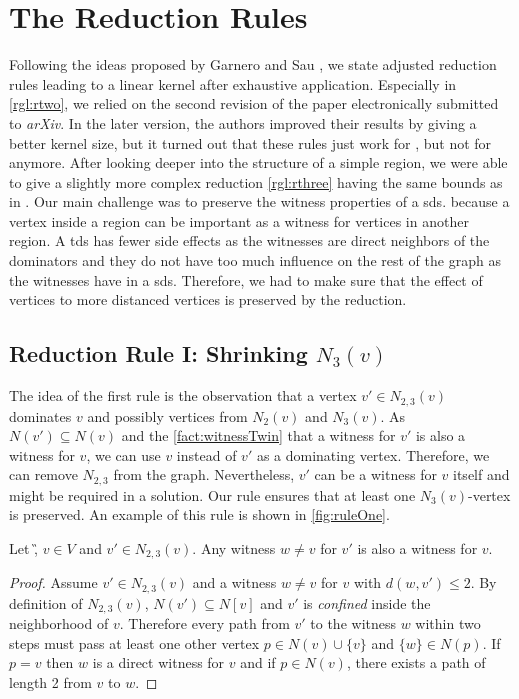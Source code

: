 \section{The Reduction Rules}

Following the ideas proposed by Garnero and Sau \cite[arXiv v2]{Garnero2018}, we state adjusted reduction rules leading to a linear kernel after exhaustive application. 
Especially in \cref{rgl:rtwo}, we relied on the second revision of the paper electronically submitted to \textit{arXiv}.
In the later version, the authors improved their results by giving a better kernel size, but it turned out that these rules just work for \tdom, but not for \sdom anymore.
After looking deeper into the structure of a simple region, we were able to give a slightly more complex reduction \cref{rgl:rthree} having the same bounds as in \cite{Garnero2018}.  
Our main challenge was to preserve the witness properties of a sds.
 because a vertex inside a region can be important as a witness for vertices in another region. 
A tds has fewer side effects as the witnesses are direct neighbors of the dominators and they do not have too much influence on the rest of the graph as the witnesses have in a sds.
Therefore, we had to make sure that the effect of vertices to more distanced vertices is preserved by the reduction.

\subsection{Reduction Rule I: Shrinking $N_3(v)$}


The idea of the first rule is the observation that a vertex $v' \in N_{2,3}(v)$ dominates $v$ and possibly vertices from $N_2(v)$ and $N_3(v)$. As $N(v') \subseteq N(v)$ and the \cref{fact:witnessTwin} that a witness for $v'$ is also a witness for $v$, we can use $v$ instead of $v'$ as a dominating vertex. Therefore, we can remove $N_{2,3}$ from the graph. Nevertheless, $v'$ can be a witness for $v$ itself and might be required in a solution. Our rule ensures that at least one $N_3(v)$-vertex is preserved. An example of this rule is shown in \cref{fig:ruleOne}.

\begin{fact}\label{fact:witnessTwin}
Let \G, $v \in V$ and $v' \in N_{2,3}(v)$. Any witness $w \neq v$ for $v'$ is also a witness for $v$. %
\end{fact}
\begin{proof}

Assume $v' \in N_{2,3}(v)$ and a witness $w \neq v$ for $v$ with $d(w,v') \leq 2$. 
By definition of $N_{2,3}(v)$, $N(v') \subseteq N[v]$ and $v'$ is \textit{confined} inside the neighborhood of $v$. 
Therefore every path from $v'$ to the witness $w$ within two steps must pass at least one other vertex $p \in N(v) \cup \{v\}$ and $\{w\} \in N(p)$.
If $p = v$ then $w$ is a direct witness for $v$ and if $p \in N(v)$, there exists a path of length 2 from $v$ to $w$.
\end{proof}

